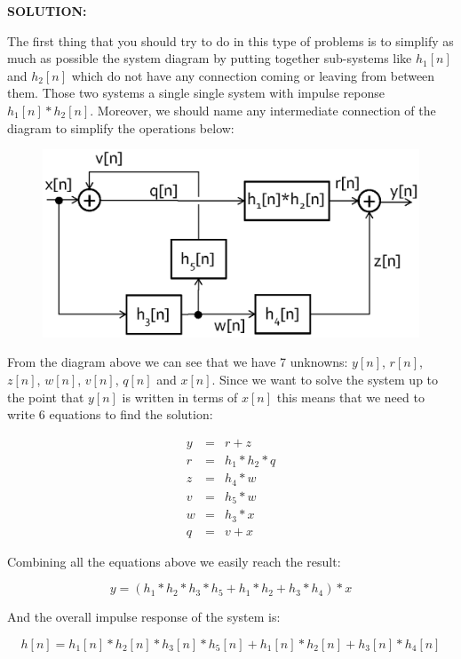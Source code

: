 \documentclass[11pt]{article}
\begin{document}
\vspace{1cm}

\textbf{SOLUTION:}


The first thing that you should try to do in this type of problems is to simplify as much as possible the system diagram by putting together sub-systems like $h_1[n]$ and $h_2[n]$ which do not have any connection coming or leaving from between them. Those two systems a single single system with impulse reponse $h_1[n]\ast h_2[n]$. Moreover, we should name any intermediate connection of the diagram to simplify the operations below:

\begin{figure}[h!]
	\centering
		\includegraphics[width=.75\textwidth]{./system2.eps}
\end{figure}


From the diagram above we can see that we have 7 unknowns: $y[n]$, $r[n]$, $z[n]$, $w[n]$, $v[n]$, $q[n]$ and $x[n]$. Since we want to solve the system up to the point that $y[n]$ is written in terms of $x[n]$ this means that we need to write 6 equations to find the solution:

\begin{eqnarray}
y &=& r+z\\
r &=& h_1\ast h_2 \ast q\\
z &=& h_4\ast w\\
v &=& h_5\ast w\\
w &=& h_3 \ast x\\
q &=& v+x
\end{eqnarray}

Combining all the equations above we easily reach the result:

\[
y = \left(h_1\ast h_2 \ast h_3\ast h_5+h_1\ast h_2+h_3\ast h_4\right)\ast x
\]

And the overall impulse response of the system is:

\[
h[n]=h_1[n]\ast h_2[n] \ast h_3[n]\ast h_5[n]+h_1[n]\ast h_2[n]+h_3[n]\ast h_4[n]
\]
\end{document}
